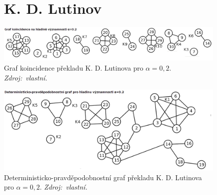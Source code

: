 \documentclass[dp.tex]{subfiles}
\begin{document}
\begin{figure}[]
\section*{K. D. Lutinov}
	\centering
	\includegraphics[max width=\textwidth,keepaspectratio=true]{imgs-99-priloha-d/d_k_20}
	\caption[Graf koincidence překladu K. D. Lutinova pro $\alpha = 0{,}2$]
            {Graf koincidence překladu K. D. Lutinova pro $\alpha = 0{,}2$. \textit{Zdroj:~vlastní.}}
	\label{fig:d_k_20}
\end{figure}
\begin{figure}[h]
	\includegraphics[max width=\textwidth,keepaspectratio=true]{imgs-99-priloha-d/d_d_20}
	\caption[Deterministicko-pravděpodobnostní graf překladu K. D. Lutinova pro $\alpha = 0{,}2$]
            {Deterministicko-pravděpodobnostní graf překladu K. D. Lutinova pro $\alpha = 0{,}2$. \textit{Zdroj:~vlastní.}}
	\label{fig:d_d_20}
\end{figure}
\end{document}
